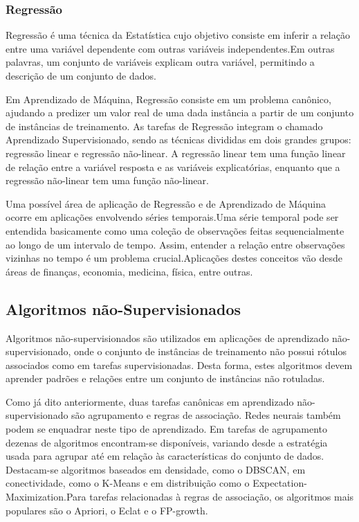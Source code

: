 \documentclass{article}
\begin{document}
\subsubsection{Regressão}

Regressão é uma técnica da Estatística cujo objetivo consiste em inferir a relação entre uma variável dependente com outras variáveis independentes.Em outras palavras, um conjunto de variáveis explicam outra variável, permitindo a descrição de um conjunto de dados.

Em Aprendizado de Máquina, Regressão consiste em um problema canônico, ajudando a predizer um valor real de uma dada instância a partir de um conjunto de instâncias de treinamento. As tarefas de Regressão integram o chamado Aprendizado Supervisionado, sendo as técnicas divididas em dois grandes grupos: regressão linear e regressão não-linear. A regressão linear tem uma função linear de relação entre a variável resposta e as variáveis explicatórias, enquanto que a regressão não-linear tem uma função não-linear.

Uma possível área de aplicação de Regressão e de Aprendizado de Máquina ocorre em aplicações envolvendo séries temporais.Uma série temporal pode ser entendida basicamente como uma coleção de observações feitas sequencialmente ao longo de um intervalo de tempo. Assim, entender a relação entre observações vizinhas no tempo é um problema crucial.Aplicações destes conceitos vão desde áreas de finanças, economia, medicina, física, entre outras.

\subsection{Algoritmos não-Supervisionados}

Algoritmos não-supervisionados são utilizados em aplicações de aprendizado não-supervisionado, onde o conjunto de instâncias de treinamento não possui rótulos associados como em tarefas supervisionadas. Desta forma, estes algoritmos devem aprender padrões e relações entre um conjunto de instâncias não rotuladas.

Como já dito anteriormente, duas tarefas canônicas em aprendizado não-supervisionado são agrupamento e regras de associação. Redes neurais também podem se enquadrar neste tipo de aprendizado. Em tarefas de agrupamento dezenas de algoritmos encontram-se disponíveis, variando desde a estratégia usada para agrupar até em relação às características do conjunto de dados. Destacam-se algoritmos baseados em densidade, como o DBSCAN, em conectividade, como o K-Means e em distribuição como o Expectation-Maximization.Para tarefas relacionadas à regras de associação, os algoritmos mais populares são o Apriori, o Eclat e o FP-growth.  
\end{document}
